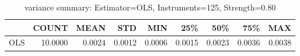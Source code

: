 \begin{table}[ht]
\centering
\caption{variance summary: Estimator=OLS, Instruments=125, Strength=0.80}
\begin{tabular}{lrrrrrrrr}
\toprule
 & COUNT & MEAN & STD & MIN & 25\% & 50\% & 75\% & MAX \\
\midrule
OLS & 10.0000 & 0.0024 & 0.0012 & 0.0006 & 0.0015 & 0.0023 & 0.0036 & 0.0038 \\
\bottomrule
\end{tabular}
\end{table}

